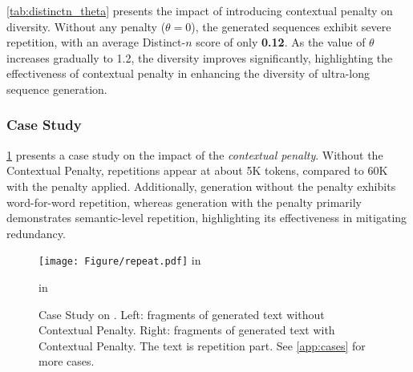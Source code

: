 \cref{tab:distinctn_theta} presents the impact of introducing contextual penalty on diversity. Without any penalty ($\theta = 0$), the generated sequences exhibit severe repetition, with an average Distinct-$n$ score of only \textbf{0.12}. As the value of $\theta$ increases gradually to 1.2, the diversity improves significantly, highlighting the effectiveness of contextual penalty in enhancing the diversity of ultra-long sequence generation.

\subsubsection{Case Study}

\cref{fig:case} presents a case study on the impact of the \textit{contextual penalty}. Without the Contextual Penalty, repetitions appear at about 5K tokens, compared to 60K with the penalty applied. Additionally, generation without the penalty exhibits word-for-word repetition, whereas generation with the penalty primarily demonstrates semantic-level repetition, highlighting its effectiveness in mitigating redundancy.

\begin{figure}[ht]
    \centering
    \texttt{[image: Figure/repeat.pdf]}
     in
    \caption{Case Study on \llama. Left: fragments of generated text without Contextual Penalty. Right: fragments of generated text with Contextual Penalty. The  text is repetition part. See \cref{app:cases} for more cases.}
    \label{fig:case}
     in
\end{figure}

